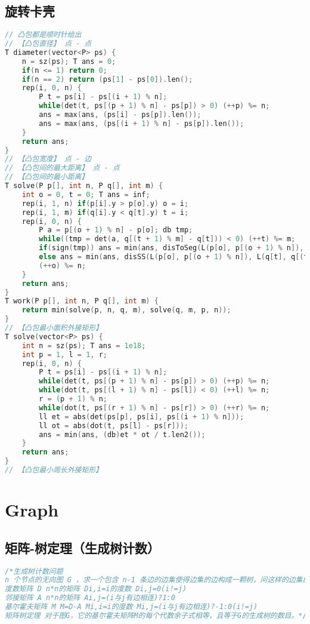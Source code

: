 \subsection{旋转卡壳}
\begin{lstlisting}[language=C++]
// 凸包都是顺时针给出
// 【凸包直径】 点 - 点
T diameter(vector<P> ps) {
	n = sz(ps); T ans = 0;
	if(n <= 1) return 0;
	if(n == 2) return (ps[1] - ps[0]).len();
	rep(i, 0, n) {
		P t = ps[i] - ps[(i + 1) % n];
		while(det(t, ps[(p + 1) % n] - ps[p]) > 0) (++p) %= n;
		ans = max(ans, (ps[i] - ps[p]).len());
		ans = max(ans, (ps[(i + 1) % n] - ps[p]).len());
	}
	return ans;
}
// 【凸包宽度】 点 - 边
// 【凸包间的最大距离】 点 - 点
// 【凸包间的最小距离】
T solve(P p[], int n, P q[], int m) {
	int o = 0, t = 0; T ans = inf;
	rep(i, 1, n) if(p[i].y > p[o].y) o = i;
	rep(i, 1, m) if(q[i].y < q[t].y) t = i;
	rep(i, 0, n) {
		P a = p[(o + 1) % n] - p[o]; db tmp;
		while((tmp = det(a, q[(t + 1) % m] - q[t])) < 0) (++t) %= m;
		if(sign(tmp)) ans = min(ans, disToSeg(L(p[o], p[(o + 1) % n]), q[t]));
		else ans = min(ans, disSS(L(p[o], p[(o + 1) % n]), L(q[t], q[(t + 1) % m])));
		(++o) %= n;
	}
	return ans;
}
T work(P p[], int n, P q[], int m) {
	return min(solve(p, n, q, m), solve(q, m, p, n));
}
// 【凸包最小面积外接矩形】
T solve(vector<P> ps) {
	int n = sz(ps); T ans = 1e18;
	int p = 1, l = 1, r;
	rep(i, 0, n) {
		P t = ps[i] - ps[(i + 1) % n];
		while(det(t, ps[(p + 1) % n] - ps[p]) > 0) (++p) %= n;
		while(dot(t, ps[(l + 1) % n] - ps[l]) < 0) (++l) %= n;
		r = (p + 1) % n;
		while(dot(t, ps[(r + 1) % n] - ps[r]) > 0) (++r) %= n;
		ll et = abs(det(ps[p], ps[i], ps[(i + 1) % n]));
		ll ot = abs(dot(t, ps[l] - ps[r]));
		ans = min(ans, (db)et * ot / t.len2());
	}
	return ans;
}
// 【凸包最小周长外接矩形】
\end{lstlisting}

\section{Graph}
\subsection{矩阵-树定理（生成树计数）}
\begin{lstlisting}[language=C++]
/*生成树计数问题
n 个节点的无向图 G ，求一个包含 n-1 条边的边集使得边集的边构成一颗树，问这样的边集的数量
度数矩阵 D n*n的矩阵 Di,i=i的度数 Di,j=0(i!=j)
邻接矩阵 A n*n的矩阵 Ai,j=(i与j有边相连)?1:0
基尔霍夫矩阵 M M=D-A Mi,i=i的度数 Mi,j=(i与j有边相连)?-1:0(i!=j)
矩阵树定理 对于图G，它的基尔霍夫矩阵M的每个代数余子式相等，且等于G的生成树的数目。*/
\end{lstlisting}

